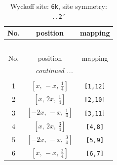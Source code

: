 \documentclass[fleqn,8pt]{jsarticle}
\begin{document}
\renewcommand{\arraystretch}{1.2}
\begin{longtable}{ccc}
\caption{Wyckoff site: {\tt 6k}, site symmetry: {\tt ..2'}}
 \\
 \hline \hline
No. & position & mapping \\ \hline \endfirsthead

\multicolumn{2}{l}{\tablename\ \thetable{}} \\
 \hline \hline
No. & position & mapping \\ \hline \endhead

 \hline \hline
\multicolumn{2}{r}{\footnotesize\it continued ...} \\ \endfoot

 \hline \hline
\multicolumn{2}{r}{} \\ \endlastfoot

1 & $\left[ x,\, - x,\, \frac{1}{4} \right]$ & {\tt [1,12]} \\ \hline
2 & $\left[ x,\, 2 x,\, \frac{1}{4} \right]$ & {\tt [2,10]} \\ \hline
3 & $\left[ - 2 x,\, - x,\, \frac{1}{4} \right]$ & {\tt [3,11]} \\ \hline
4 & $\left[ x,\, 2 x,\, \frac{3}{4} \right]$ & {\tt [4,8]} \\ \hline
5 & $\left[ - 2 x,\, - x,\, \frac{3}{4} \right]$ & {\tt [5,9]} \\ \hline
6 & $\left[ x,\, - x,\, \frac{3}{4} \right]$ & {\tt [6,7]} \\
\end{longtable}
\renewcommand{\arraystretch}{1.2}
\end{document}
